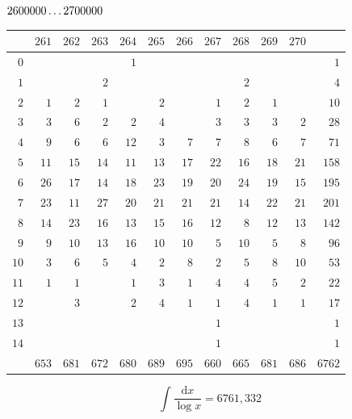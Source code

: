 \clearpage
\noindent\begin{minipage}{\linewidth}\centering
{}
\(2600000\mathinner{.\,.\,.}2700000\)\par\smallskip
\begingroup\fontsize{10.5}{11.5}\selectfont\setlength{\tabcolsep}{3.5pt}\renewcommand{\arraystretch}{1}
\begin{tabular}{r|rrrrrrrrrr|r}\hline
 & $261$ & $262$ & $263$ & $264$ & $265$ & $266$ & $267$ & $268$ & $269$ & $270$ &  \\ \hline
$0$ &  &  &  & $1$ &  &  &  &  &  &  & $1$ \\
$1$ &  &  & $2$ &  &  &  &  & $2$ &  &  & $4$ \\
$2$ & $1$ & $2$ & $1$ &  & $2$ &  & $1$ & $2$ & $1$ &  & $10$ \\
$3$ & $3$ & $6$ & $2$ & $2$ & $4$ &  & $3$ & $3$ & $3$ & $2$ & $28$ \\
$4$ & $9$ & $6$ & $6$ & $12$ & $3$ & $7$ & $7$ & $8$ & $6$ & $7$ & $71$ \\
$5$ & $11$ & $15$ & $14$ & $11$ & $13$ & $17$ & $22$ & $16$ & $18$ & $21$ & $158$ \\
$6$ & $26$ & $17$ & $14$ & $18$ & $23$ & $19$ & $20$ & $24$ & $19$ & $15$ & $195$ \\
$7$ & $23$ & $11$ & $27$ & $20$ & $21$ & $21$ & $21$ & $14$ & $22$ & $21$ & $201$ \\
$8$ & $14$ & $23$ & $16$ & $13$ & $15$ & $16$ & $12$ & $8$ & $12$ & $13$ & $142$ \\
$9$ & $9$ & $10$ & $13$ & $16$ & $10$ & $10$ & $5$ & $10$ & $5$ & $8$ & $96$ \\
$10$ & $3$ & $6$ & $5$ & $4$ & $2$ & $8$ & $2$ & $5$ & $8$ & $10$ & $53$ \\
$11$ & $1$ & $1$ &  & $1$ & $3$ & $1$ & $4$ & $4$ & $5$ & $2$ & $22$ \\
$12$ &  & $3$ &  & $2$ & $4$ & $1$ & $1$ & $4$ & $1$ & $1$ & $17$ \\
$13$ &  &  &  &  &  &  & $1$ &  &  &  & $1$ \\
$14$ &  &  &  &  &  &  & $1$ &  &  &  & $1$ \\
\hline
 & $653$ & $681$ & $672$ & $680$ & $689$ & $695$ & $660$ & $665$ & $681$ & $686$ & $6762$ \\ \hline
\end{tabular}\par\endgroup
\setlength{\abovedisplayskip}{6pt}\setlength{\belowdisplayskip}{4pt}
\[\int\frac{\mathrm{d}x}{\log x}=6761{,}332\]
\end{minipage}

